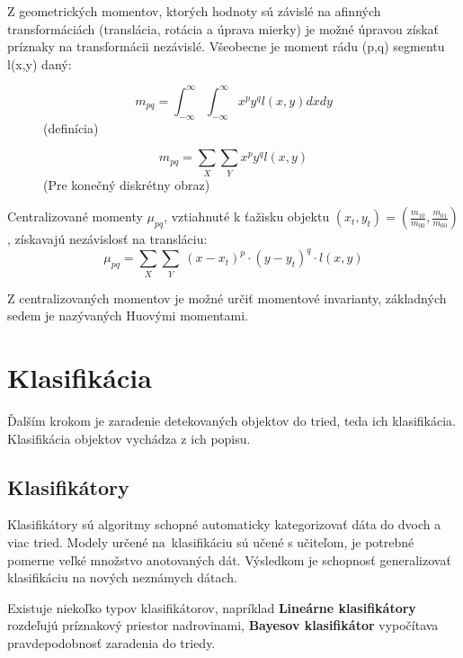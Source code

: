         Z geometrických momentov, ktorých hodnoty sú závislé na afinných transformáciách (translácia, rotácia a úprava mierky) je možné úpravou získať príznaky na transformácii nezávislé. \cite{Erbo2017} Všeobecne je moment rádu (p,q) segmentu l(x,y) daný:
        \begin{figure}[!ht]
            \begin{minipage}[b]{0.45\textwidth}
                \[
                    m_{pq} = \int_{-\infty}^\infty\int_{-\infty}^\infty x^p y^q l(x,y) dx dy
                \]
                \centering
                (definícia)
            \end{minipage}
            \begin{minipage}[b]{0.45\textwidth}
                \[
                    m_{pq} = \sum_{X}\sum_{Y} x^p y^q l(x,y)
                \]
                \centering
                (Pre konečný diskrétny obraz)
            \end{minipage}
        \end{figure}

        Centralizované momenty \(\mu_{pq}\), vztiahnuté k ťažisku objektu \((x_t,y_t) = (\frac{m_{10}}{m_{00}},\frac{m_{01}}{m_{00}})\), získavajú nezávislosť na transláciu: \[\mu_{pq} = \sum_X\sum_Y\ (x-x_t)^p \cdot (y-y_t)^q \cdot l(x,y)\]

        Z centralizovaných momentov je možné určiť momentové invarianty, základných sedem je nazývaných Huovými momentami.

\chapter{Klasifikácia}

    Ďalším krokom je zaradenie detekovaných objektov do tried, teda ich klasifikácia. Klasifikácia objektov vychádza z ich popisu.

    \section{Klasifikátory}

        Klasifikátory sú algoritmy schopné automaticky kategorizovať dáta do dvoch a viac tried. Modely určené na~klasifikáciu sú učené s učiteľom, je potrebné pomerne veľké množstvo anotovaných dát. Výsledkom je schopnosť generalizovať klasifikáciu na nových neznámych dátach.

        Existuje niekoľko typov klasifikátorov, napríklad \textbf{Lineárne klasifikátory} rozdeľujú príznakový priestor nadrovinami, \textbf{Bayesov klasifikátor} vypočítava pravdepodobnosť zaradenia do triedy.


